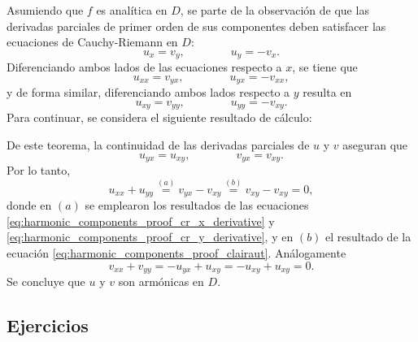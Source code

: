 \documentclass[a4paper]{report}
\begin{document}
Asumiendo que \(f\) es analítica en \(D\), se parte de la observación de que las derivadas parciales de primer orden de sus componentes deben satisfacer las ecuaciones de Cauchy-Riemann en \(D\):
\[
 u_x=v_y,
 \qquad\qquad
 u_y=-v_x.
\]
Diferenciando ambos lados de las ecuaciones respecto a \(x\), se tiene que 
\begin{equation}\label{eq:harmonic_components_proof_cr_x_derivative}
  u_{xx}=v_{yx},
 \qquad\qquad
 u_{yx}=-v_{xx},
\end{equation}
y de forma similar, diferenciando ambos lados respecto a \(y\) resulta en
\begin{equation}\label{eq:harmonic_components_proof_cr_y_derivative}
 u_{xy}=v_{yy},
 \qquad\qquad
 u_{yy}=-v_{xy}. 
\end{equation}
Para continuar, se considera el siguiente resultado de cálculo:

\medskip
\noindent
{} 

\medskip
\noindent
De este teorema, la continuidad de las derivadas parciales de \(u\) y \(v\) aseguran que
\begin{equation}\label{eq:harmonic_components_proof_clairaut}
 u_{yx}=u_{xy},
 \qquad\qquad
 v_{yx}=v_{xy}.
\end{equation}
Por lo tanto,
\[
 u_{xx}+u_{yy}\overset{(a)}{=}v_{yx}-v_{xy}\overset{(b)}{=}v_{xy}-v_{xy}=0,
\]
donde en \((a)\) se emplearon los resultados de las ecuaciones \ref{eq:harmonic_components_proof_cr_x_derivative} y \ref{eq:harmonic_components_proof_cr_y_derivative}, y en \((b)\) el resultado de la ecuación \ref{eq:harmonic_components_proof_clairaut}. Análogamente
\[
 v_{xx}+v_{yy}=-u_{yx}+u_{xy}=-u_{xy}+u_{xy}=0.
\]
Se concluye que \(u\) y \(v\) son armónicas en \(D\).

\subsection{Ejercicios}
\end{document}
